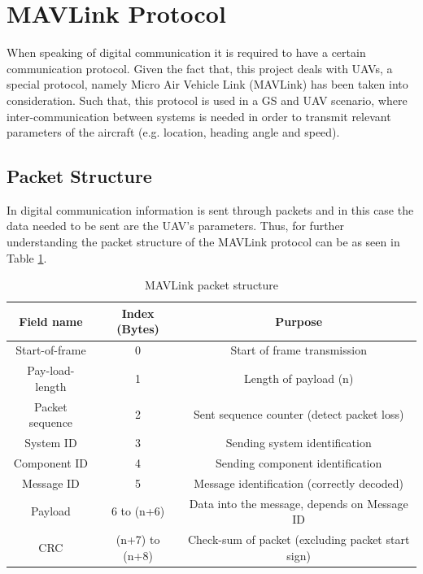 \section{MAVLink Protocol}\label{sec:mavlink}
When speaking of digital communication it is required to have a certain communication protocol. Given the fact that, this project deals with UAVs, a special protocol, namely Micro Air Vehicle Link (MAVLink) has been taken into consideration. Such that, this protocol is used in a GS and UAV scenario, where inter-communication between systems is needed in order to transmit relevant parameters of the aircraft (e.g. location, heading angle and speed).  

\subsection{Packet Structure}
In digital communication information is sent through packets and in this case the data needed to be sent are the UAV's parameters. Thus, for further understanding the packet structure of the MAVLink protocol can be as seen in Table \ref{tab:mavlink}.

\begin{table}[h]
	\centering
	\begin{tabular}{|c||c|c|}
		\hline
		Field name       & Index (Bytes)  & Purpose											     \\ \hline\hline
		Start-of-frame   &      0         & Start of frame transmission 							   \\ \hline
		Pay-load-length  &      1         & Length of payload (n)       							   \\ \hline
		Packet sequence  &      2    	  & Sent sequence counter (detect packet loss)                 \\ \hline
		System ID        & 		3		  & Sending system identification 							   \\ \hline
		Component ID     & 		4 		  & Sending component identification 						   \\ \hline
		Message ID       & 		5 		  & Message identification (correctly decoded)      		   \\ \hline
		Payload          &   6 to (n+6)   & Data into the message, depends on Message ID        	   \\ \hline
		CRC              & (n+7) to (n+8) & Check-sum of packet (excluding packet start sign)          \\ \hline
	\end{tabular}
	\caption{MAVLink packet structure}
	\label{tab:mavlink}
\end{table}

